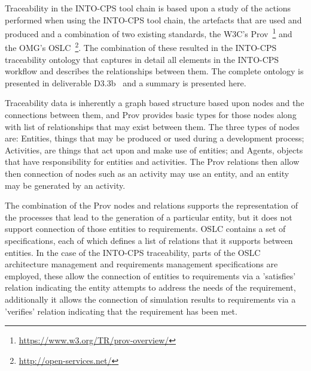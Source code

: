 
Traceability in the INTO-CPS tool chain is based upon a study of the actions performed when using the INTO-CPS tool chain, the artefacts that are used and produced and a combination of two existing standards, the W3C's Prov~\footnote{\url{https://www.w3.org/TR/prov-overview/}} and the OMG's OSLC~\footnote{\url{http://open-services.net/}}.   The combination of these resulted in the INTO-CPS traceability ontology that captures in detail all elements in the INTO-CPS workflow and describes the relationships between them.  The complete ontology is presented in deliverable D3.3b~\cite{INTOCPSD3.3b} and a summary is presented here.

Traceability data is inherently a graph based structure based upon nodes and the connections between them, and Prov provides basic types for those nodes along with list of relationships that may exist between them.  The three types of nodes are: Entities, things that may be produced or used during a development process; Activities, are things that act upon and make use of entities; and Agents, objects that have responsibility for entities and activities.  The Prov relations then allow then connection of nodes such as an activity may use an entity, and an entity may be generated by an activity.

The combination of the Prov nodes and relations supports the representation of the processes that lead to the generation of a particular entity, but it does not support connection of those entities to requirements.  OSLC contains a set of specifications, each of which defines a list of relations that it supports between entities. In the case of the INTO-CPS traceability, parts of the OSLC architecture management and requirements management specifications are employed, these allow the connection of entities to requirements via a 'satisfies' relation indicating the entity attempts to address the needs of the requirement, additionally it allows the connection of simulation results to requirements via a 'verifies' relation indicating that the requirement has been met.



